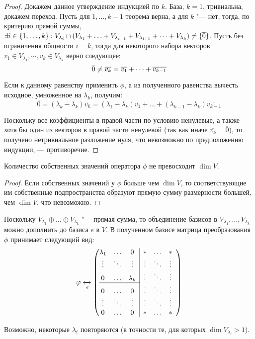 \begin{proof}
	Докажем данное утверждение индукцией по $k$. База, $k = 1$, тривиальна, докажем переход. Пусть для $1, \dots, k - 1$ теорема верна, а для $k$ "--- нет, тогда, по критерию прямой суммы, $\exists i \in \{1, \dots, k\}: V_{\lambda_i} \cap (V_{\lambda_1} + \dots \hm{+} V_{\lambda_{i - 1}} + V_{\lambda_{i + 1}} + \dots + V_{\lambda_k}) \ne \{\overline{0}\}$. Пусть без ограничения общности $i = k$, тогда для некоторого набора векторов $\overline{v_1} \in V_{\lambda_1}, \cdots, \overline{v_k} \in V_{\lambda_k}$ верно следующее:
	\[\overline{0} \ne \overline{v_k} \hm{=} \overline{v_1} + \dots + \overline{v_{k - 1}}\]
	
	Если к данному равенству применить $\phi$, а из полученного равенства вычесть исходное, умноженное на $\lambda_k$, получим:
	\[\overline{0} = (\lambda_k - \lambda_k)\overline{v_k} = (\lambda_1 - \lambda_k)\overline{v_1} + \dots + (\lambda_{k - 1} - \lambda_k)\overline{v_{k - 1}}\]
	
	Поскольку все коэффициенты в правой части по условию ненулевые, а также хотя бы один из векторов в правой части ненулевой (так как иначе $\overline{v_k} = \overline{0}$), то получено нетривиальное разложение нуля, что невозможно по предположению индукции, --- противоречие.
\end{proof}

\begin{corollary}
	Количество собственных значений оператора $\phi$ не превосходит $\dim{V}$.
\end{corollary}

\begin{proof}
	Если собственных значений у $\phi$ больше чем $\dim{V}$, то соответствующие им собственные подпространства образуют прямую сумму размерности большей, чем $\dim{V}$, что невозможно.
\end{proof}

\begin{note}
	Поскольку $V_{\lambda_1} \oplus \dots \oplus V_{\lambda_k}$ "--- прямая сумма, то объединение базисов в $V_{\lambda_1}, \dots, V_{\lambda_k}$ можно дополнить до базиса $e$ в $V$. В полученном базисе матрица преобразования $\phi$ принимает следующий вид:
	\[
	\phi \xleftrightarrow[e]{}
	\left(\begin{array}{@{}ccc|cccc@{}}
		\lambda_1 & \dots & 0 & * & \dots & *\\
		\vdots & \ddots & \vdots & \vdots & \ddots & \vdots\\
		0 & \dots & \lambda_k & \vdots &\ddots & \vdots\\
		\cline{1-3}
		0 &\dots & 0 & \vdots &\ddots & \vdots\\
		\vdots & \ddots & \vdots & \vdots & \ddots & \vdots\\
		0 & \dots & 0 & * &\dots & * 
	\end{array}\right)
	\]
	
	Возможно, некоторые $\lambda_i$ повторяются (в точности те, для которых $\dim{V_{\lambda_i}} > 1$).
\end{note}

